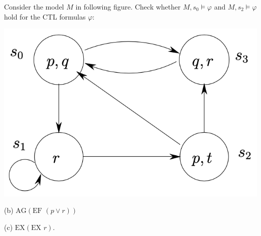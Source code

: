 Consider the model $M$ in following figure. Check whether $M, s_0 \models \varphi$
 and $M, s_2 \models \varphi$ hold for the CTL formulas $\varphi$: 
 \begin{center}
    \includegraphics[scale=0.5]{Details/p4.png}
\end{center}

(b) $\textrm{AG}(\textrm{EF }(p\vee r))$

(c) $\textrm{EX}(\textrm{EX }r)$.